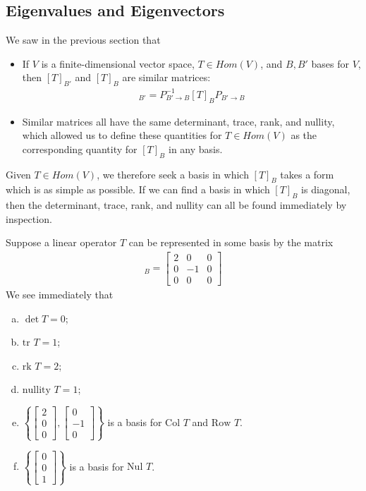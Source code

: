 \documentclass[12pt,letterpaper,reqno]{article}
\numberwithin{equation}{section}
\newcommand{\nullity}{\text{nullity }}
\begin{document}
\subsection{Eigenvalues and Eigenvectors}
We saw in the previous section that 
\begin{itemize}
	\item If $V$ is a finite-dimensional vector space, $T \in Hom(V)$, and $B,B'$ bases for $V$, then $[T]_{B'}$ and $[T]_B$ are similar matrices:
\begin{align*}
	[T]_{B'}=P_{B' \to B}^{-1}[T]_BP_{B' \to B}
\end{align*}
\item Similar matrices all have the same determinant, trace, rank, and nullity, which allowed us to define these quantities for $T \in Hom(V)$ as the corresponding quantity for $[T]_B$ in any basis.
\end{itemize}
Given $T \in Hom(V)$, we therefore seek a basis in which $[T]_B$ takes a form which is as simple as possible. 
If we can find a basis in which $[T]_B$ is diagonal, then the determinant, trace, rank, and nullity can all be found immediately by inspection.
\begin{example}
Suppose a linear operator $T$ can be represented in some basis by the matrix
\begin{align*}
	[T]_B=\begin{bmatrix}
		2 & 0 & 0 \\
		0 & -1 & 0 \\
		0 & 0 & 0
	\end{bmatrix}
\end{align*}
We see immediately that
\begin{enumerate}[(a)]
	\item $\det T=0$;
	\item $\text{tr } T=1$;
	\item $\text{rk } T=2$;
	\item $\nullity T=1$;
	\item $\left\{\begin{bmatrix}
		2 \\ 0 \\ 0
	\end{bmatrix}, \begin{bmatrix}
		0 \\ -1 \\ 0
	\end{bmatrix}\right\}$ is a basis for $\text{Col }T$ and $\text{Row }T$.
	\item $\left\{\begin{bmatrix}
		0 \\ 0 \\ 1
	\end{bmatrix}\right\}$ is a basis for $\text{Nul }T$.
\end{enumerate}
\end{example}
\end{document}
